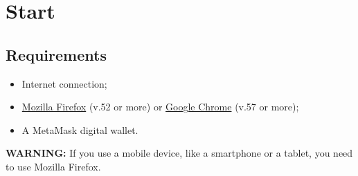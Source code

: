 \documentclass[ManualeUtente.tex]{subfiles}
\begin{document}
\chapter{Start}

\section{Requirements}
\begin{itemize}
	\item Internet connection;
	\item \href{https://www.mozilla.org/en-US/firefox/new/}{Mozilla Firefox} (v.52 or more) or	
	\href{https://www.google.com/intl/en/chrome/}{Google Chrome} (v.57 or more);
	\item A MetaMask digital wallet.
\end{itemize}

\textbf{WARNING:} If you use a mobile device, like a smartphone or a tablet, you need to use Mozilla Firefox.
\end{document}
